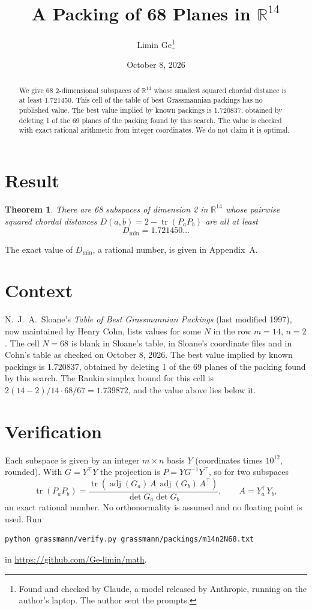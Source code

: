 \documentclass[11pt,a4paper]{article}
\title{A Packing of 68 Planes in $\mathbb{R}^{14}$}
\author{Limin Ge\thanks{Found and checked by Claude, a model released by Anthropic, running on the author's laptop. The author sent the prompts.}}
\date{October 8, 2026}
\newtheorem*{theorem}{Theorem}
\begin{document}
\maketitle
\begin{abstract}
We give 68 2-dimensional subspaces of $\mathbb{R}^{14}$ whose smallest squared chordal distance is at least 1.721450. This cell of the table of best Grassmannian packings has no published value. The best value implied by known packings is 1.720837, obtained by deleting 1 of the 69 planes of the packing found by this search. The value is checked with exact rational arithmetic from integer coordinates. We do not claim it is optimal.
\end{abstract}

\section{Result}
\begin{theorem}
There are 68 subspaces of dimension 2 in $\mathbb{R}^{14}$ whose pairwise squared chordal distances $D(a,b) = 2 - \operatorname{tr}(P_aP_b)$ are all at least
\[ D_{\min} = 1.721450\ldots \]
\end{theorem}
The exact value of $D_{\min}$, a rational number, is given in Appendix~A.


\section{Context}
N.~J.~A.~Sloane's \emph{Table of Best Grassmannian Packings} (last modified 1997), now maintained by Henry Cohn, lists values for some $N$ in the row $m=14$, $n=2$. The cell $N=68$ is blank in Sloane's table, in Sloane's coordinate files and in Cohn's table as checked on October 8, 2026. The best value implied by known packings is 1.720837, obtained by deleting 1 of the 69 planes of the packing found by this search. The Rankin simplex bound for this cell is $2(14-2)/14\cdot 68/67 = 1.739872$, and the value above lies below it.


\section{Verification}
Each subspace is given by an integer $m\times n$ basis $Y$ (coordinates times $10^{12}$, rounded). With $G=Y^\top Y$ the projection is $P=YG^{-1}Y^\top$, so for two subspaces
\[ \operatorname{tr}(P_aP_b)=\frac{\operatorname{tr}(\operatorname{adj}(G_a)\,A\,\operatorname{adj}(G_b)\,A^\top)}{\det G_a\det G_b},\qquad A=Y_a^\top Y_b, \]
an exact rational number. No orthonormality is assumed and no floating point is used. Run
\begin{verbatim}
python grassmann/verify.py grassmann/packings/m14n2N68.txt
\end{verbatim}
in \url{https://github.com/Ge-limin/math}.
\end{document}
